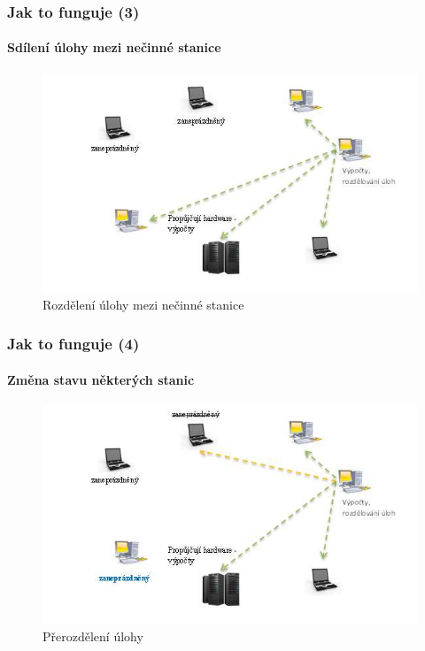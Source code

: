\documentclass{beamer}
\begin{document}
\begin {frame}
\frametitle{Jak to funguje (3)}
\framesubtitle {Sdílení úlohy mezi nečinné stanice}
	\begin {figure}
		\includegraphics[height=0.7\textheight]{faze2}
		\caption{Rozdělení úlohy mezi nečinné stanice}
	\end {figure}
\end {frame}

\begin {frame}
\frametitle{Jak to funguje (4)}
\framesubtitle {Změna stavu některých stanic}
	\begin {figure}
		\includegraphics[height=0.7\textheight]{faze3}
		\caption{Přerozdělení úlohy}
	\end {figure}
\end {frame}
\end{document}
